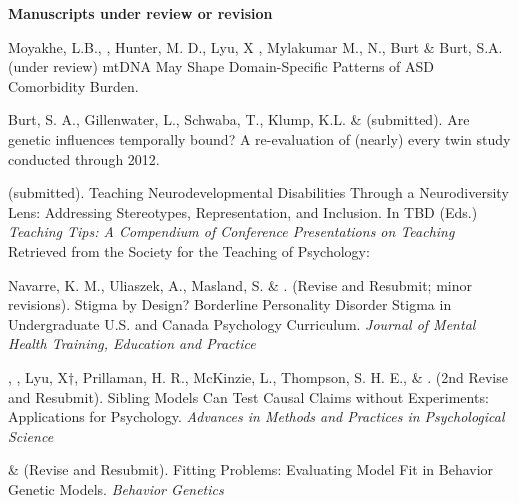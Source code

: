 

{\large \textbf{Manuscripts under review or revision}}
\begin{etaremune}
\item Moyakhe, L.B., \meb, Hunter, M. D., Lyu, X , Mylakumar M., N., Burt \& Burt, S.A. (under review) mtDNA May Shape Domain-Specific Patterns of ASD Comorbidity Burden. %
\item Burt, S. A., Gillenwater, L.,  Schwaba, T., Klump, K.L. \& \meb (submitted). Are genetic influences temporally bound? A re-evaluation of (nearly) every twin study conducted through 2012. %
\item \meb (submitted). Teaching Neurodevelopmental Disabilities Through a Neurodiversity Lens: Addressing Stereotypes, Representation, and Inclusion.  In TBD  (Eds.) \textit{Teaching Tips: A Compendium of Conference Presentations on Teaching} Retrieved from the Society for the Teaching of Psychology: \href{http://teachpsych.org/ebooks/}{\small\color{blue}{teachpsych.org/ebooks/}}

\item Navarre, K. M.\noteB, Uliaszek, A., Masland, S. \& \meb. (Revise and Resubmit; minor revisions). Stigma by Design? Borderline Personality Disorder Stigma in Undergraduate U.S. and Canada Psychology Curriculum. \textit{Journal of Mental Health Training, Education and Practice}

\item \meb, \jt, Lyu, X$\dagger$, Prillaman, H. R.\noteA, McKinzie, L.\noteA, Thompson, S. H. E.\noteA, \& \joe. (2nd Revise and Resubmit). Sibling Models Can Test Causal Claims without Experiments: Applications for Psychology.\href{https://www.medrxiv.org/content/10.1101/2025.08.25.25334395v1}{\small\color{blue}{medrxiv.org/\allowbreak content/\allowbreak 10.1101/\allowbreak 2025.08.25.25334395v1}} \textit{Advances in Methods and Practices in Psychological Science} %

\item \meb \& \joe (Revise and Resubmit). Fitting Problems: Evaluating Model Fit in Behavior Genetic Models. \textit{Behavior Genetics}  \href{https://doi.org/10.31234/osf.io/qys83}{\small\color{blue}{10.31234/osf.io/qys83}}
\end{etaremune}
